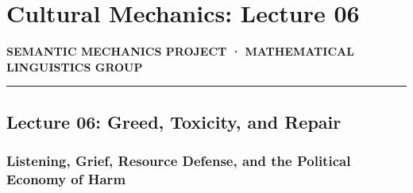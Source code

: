 \documentclass[
  11pt,
  letterpaper,
]{article}
\author{}
\date{}
\begin{document}
\section{Cultural Mechanics: Lecture
06}\label{cultural-mechanics-lecture-06}

\textbf{SEMANTIC MECHANICS PROJECT · MATHEMATICAL LINGUISTICS GROUP}

\begin{center}\rule{0.5\linewidth}{0.5pt}\end{center}

\subsection{Lecture 06: Greed, Toxicity, and
Repair}\label{lecture-06-greed-toxicity-and-repair}

\subsubsection{Listening, Grief, Resource Defense, and the Political
Economy of
Harm}\label{listening-grief-resource-defense-and-the-political-economy-of-harm}
\end{document}
